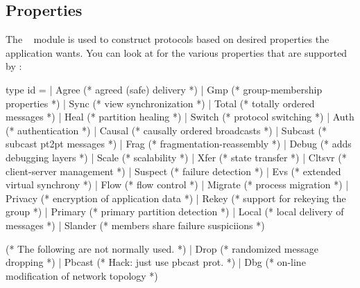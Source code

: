 %
%
%
\subsection{Properties}
\label{sec:properties}

The \ensemble\  module is used to construct protocols based on
desired properties the application wants.  You can look at 
for the various properties that are supported by \ensemble:
\begin{codebox}
type id =
  | Agree				(* agreed (safe) delivery *)
  | Gmp					(* group-membership properties *)
  | Sync				(* view synchronization *)
  | Total				(* totally ordered messages *)
  | Heal				(* partition healing *)
  | Switch		  (* protocol switching *)
  | Auth				(* authentication *)
  | Causal			(* causally ordered broadcasts *)
  | Subcast			(* subcast pt2pt messages *)
  | Frag				(* fragmentation-reassembly *)
  | Debug				(* adds debugging layers *)
  | Scale				(* scalability *)
  | Xfer				(* state transfer *)
  | Cltsvr			(* client-server management *)
  | Suspect			(* failure detection *)
  | Evs					(* extended virtual synchrony *)
  | Flow				(* flow control *)
  | Migrate			(* process migration *)
  | Privacy			(* encryption of application data *)
  | Rekey				(* support for rekeying the group *)
  | Primary			(* primary partition detection *)
  | Local				(* local delivery of messages *)
  | Slander			(* members share failure suspiciions *)

    (* The following are not normally used.
     *)
  | Drop				(* randomized message dropping *)
  | Pbcast			(* Hack: just use pbcast prot. *)
  | Dbg         (* on-line modification of network topology *)
\end{codebox}

